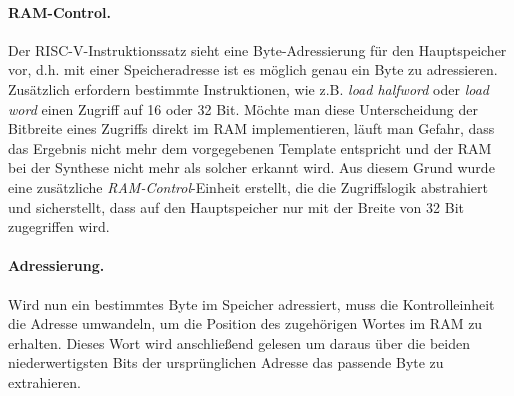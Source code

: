 \paragraph{RAM-Control.} Der RISC-V-Instruktionssatz sieht eine Byte-Adressierung für den Hauptspeicher vor, d.h. mit einer Speicheradresse ist es möglich genau ein Byte zu adressieren.
Zusätzlich erfordern bestimmte Instruktionen, wie z.B. \textit{load halfword} oder \textit{load word} einen Zugriff auf 16 oder 32 Bit.
Möchte man diese Unterscheidung der Bitbreite eines Zugriffs direkt im RAM implementieren, läuft man Gefahr, dass das Ergebnis nicht mehr dem vorgegebenen Template entspricht und der RAM bei der Synthese nicht mehr als solcher erkannt wird.
Aus diesem Grund wurde eine zusätzliche \textit{RAM-Control}-Einheit erstellt, die die Zugriffslogik abstrahiert und sicherstellt, dass auf den Hauptspeicher nur mit der Breite von 32 Bit zugegriffen wird.

\paragraph{Adressierung.} Wird nun ein bestimmtes Byte im Speicher adressiert, muss die Kontrolleinheit die Adresse umwandeln, um die Position des zugehörigen Wortes im RAM zu erhalten. 
Dieses Wort wird anschließend gelesen um daraus über die beiden niederwertigsten Bits der ursprünglichen Adresse das passende Byte zu extrahieren.

